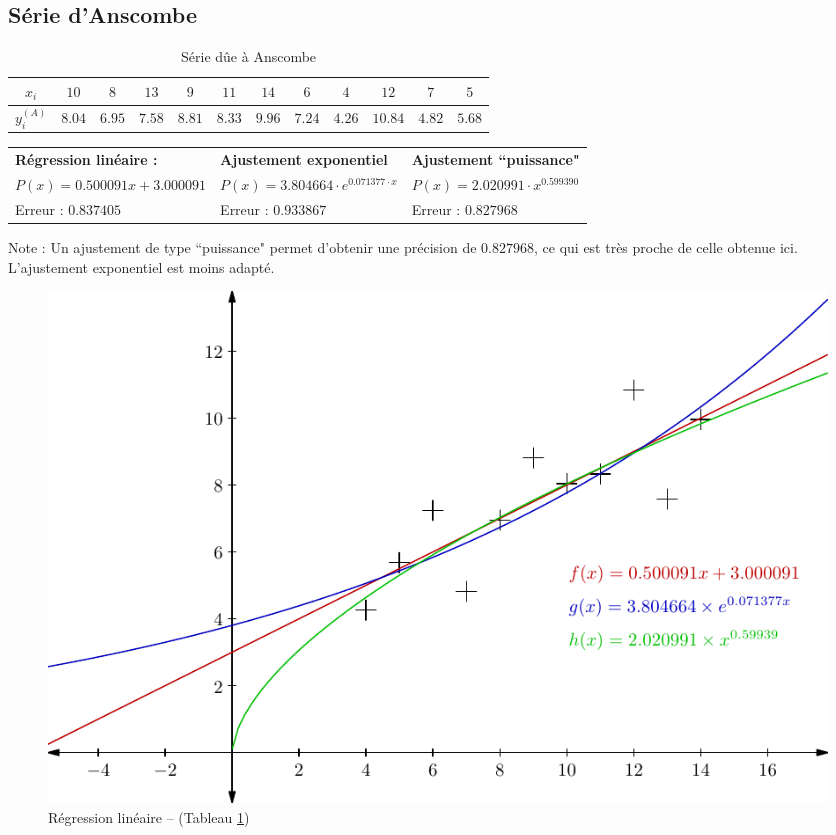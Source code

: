 \documentclass{report}
\begin{document}
      \subsection{Série d'Anscombe}
	\begin{table}[h]
	  \centering
	  \begin{tabular}{| c | c | c | c | c | c | c | c | c | c | c | c |}
	    \hline 
	    $x_{i}$ & $10$ & $8$ & $13$ & $9$ & $11$ & $14$ & $6$ & $4$ & $12$ & $7$ & $5$ \\ 
	    \hline 
	    $y^{(A)}_{i}$ & $8.04$ & $6.95$ & $7.58$ & $8.81$ & $8.33$ & $9.96$ & $7.24$ & $4.26$ & $10.84$ & $4.82$ & $5.68$ \\ 
	    \hline 
	  \end{tabular}
	  \caption{Série dûe à Anscombe}
	  \label{approx_tp2_ex1}
	\end{table}
	
	\begin{tabular}{l | l | l}
	\noindent \textbf{Régression linéaire : } & \noindent \textbf{Ajustement exponentiel} & \noindent \textbf{Ajustement ``puissance"} \\
	$P(x) = 0.500091x + 3.000091$ & $P(x) = 3.804664 \cdot e^{0.071377\cdot x}$ & $P(x) = 2.020991 \cdot x^{0.599390}$\\
	Erreur : $0.837405$ & Erreur : $0.933867$ & Erreur : $0.827968$ \\
	\end{tabular}
	\vspace{1cm}
	
	Note : Un ajustement de type ``puissance" permet d'obtenir une précision de $0.827968$, ce qui est très proche de celle obtenue ici. L'ajustement exponentiel est moins adapté.
	\begin{figure}[h]
	  \centering
	  \includegraphics{graphiques/pdf_output/reglin_tp2_ex1.pdf}
	  \caption{Régression linéaire -- (Tableau \ref{approx_tp2_ex1})}
	\end{figure}
	\newpage
\end{document}
